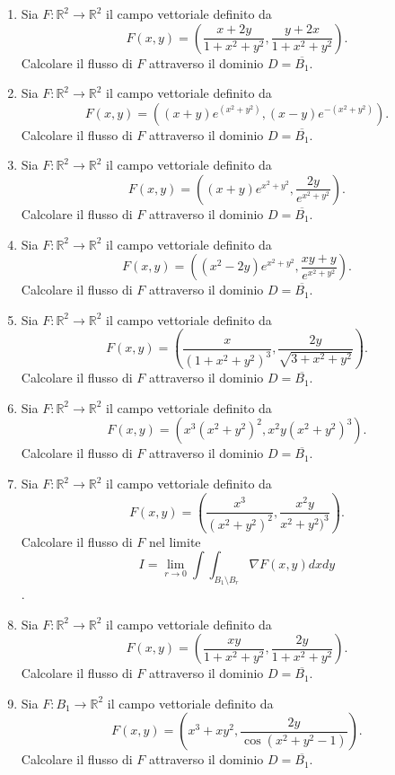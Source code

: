 \begin{enumerate}[label=\textbf{\arabic*}, leftmargin=*, start=1]
	\item Sia \( F: \mathbb{R}^2 \to \mathbb{R}^2 \) il campo vettoriale definito da
	\[
	F(x, y) = (\frac{x+2y}{1+x^2+y^2}, \frac{y+2x}{1+x^2+y^2}).
	\]
	Calcolare il flusso di \( F \) attraverso il dominio \( D = \overline{B_1} \).
	
	\item Sia \( F: \mathbb{R}^2 \to \mathbb{R}^2 \) il campo vettoriale definito da
	\[
	F(x, y) = ((x+y) e^{(x^2 + y^2)}, (x-y) e^{-(x^2 + y^2)}).
	\]
	Calcolare il flusso di \( F \) attraverso il dominio \( D = \overline{B_1} \).
	
	\item Sia \( F: \mathbb{R}^2 \to \mathbb{R}^2 \) il campo vettoriale definito da
	\[
	F(x, y) = ((x+y)e^{x^2 + y^2}, \frac{2y}{e^{x^2 + y^2}}).
	\]
	Calcolare il flusso di \( F \) attraverso il dominio \( D = \overline{B_1} \).
	
	\item Sia \( F: \mathbb{R}^2 \to \mathbb{R}^2 \) il campo vettoriale definito da
	\[
	F(x, y) = ((x^2 -2y)e^{x^2 + y^2}, \frac{xy+y}{e^{x^2 + y^2}}).
	\]
	Calcolare il flusso di \( F \) attraverso il dominio \( D = \overline{B_1} \).
	
	\item Sia \( F: \mathbb{R}^2 \to \mathbb{R}^2 \) il campo vettoriale definito da
	\[
	F(x, y) = (\frac{x}{(1+x^2+y^2)^3}, \frac{2y}{\sqrt{3+x^2+y^2}}).
	\]
	Calcolare il flusso di \( F \) attraverso il dominio \( D = \overline{B_1} \).
	
	\item Sia \( F: \mathbb{R}^2 \to \mathbb{R}^2 \) il campo vettoriale definito da
	\[
	F(x, y) = (x^3(x^2+y^2)^2, x^2y(x^2+y^2)^3 ).
	\]
	Calcolare il flusso di \( F \) attraverso il dominio \( D = \overline{B_1} \).
	
	\item Sia \( F: \mathbb{R}^2 \to \mathbb{R}^2 \) il campo vettoriale definito da
	\[
	F(x, y) = (\frac{x^3}{(x^2+y^2)^2}, \frac{x^2y}{x^2 + y^2)^3}).
	\]
	Calcolare il flusso di \( F \) nel limite \[I=\lim\limits_{r\rightarrow 0} \int \int_{B_1\setminus B_r} \nabla F(x,y)dxdy\] .
	
	\item Sia \( F: \mathbb{R}^2 \to \mathbb{R}^2 \) il campo vettoriale definito da
	\[
	F(x, y) = (\frac{xy}{1+x^2+y^2}, \frac{2y}{1+x^2+y^2}).
	\]
	Calcolare il flusso di \( F \) attraverso il dominio \( D = \overline{B_1} \).
	
	
	\item Sia \( F: B_1 \to \mathbb{R}^2 \) il campo vettoriale definito da
	\[
	F(x, y) = (x^3 +xy^2, \frac{2y}{\cos(x^2+y^2-1)}).
	\]
	Calcolare il flusso di \( F \) attraverso il dominio \( D = \overline{B_1} \).
	

\end{enumerate}
